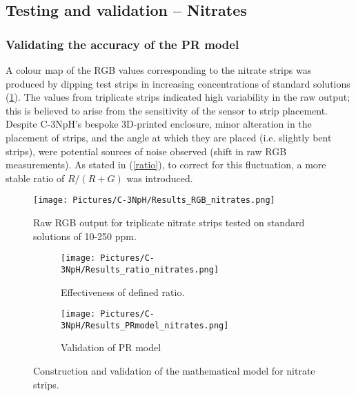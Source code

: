 






\subsection{Testing and validation -- Nitrates}

\subsubsection{Validating the accuracy of the PR model}
\noindent A colour map of the RGB values corresponding to the nitrate strips was produced by dipping test strips in increasing concentrations of standard solutions (\cref{fig:RGB_nitrates}). The values from triplicate strips indicated high variability in the raw output; this is believed to arise from the sensitivity of the sensor to strip placement. Despite C-3NpH’s bespoke 3D-printed enclosure, minor alteration in the placement of strips, and the angle at which they are placed (i.e. slightly bent strips), were potential sources of noise observed (shift in raw RGB measurements). As stated in (\cref{ratio}), to correct for this fluctuation, a more stable ratio of $R/(R+G)$ was introduced.
 
\begin{figure}[H]
	\centering
	\texttt{[image: Pictures/C-3NpH/Results\_RGB\_nitrates.png]}
	\captionsetup{justification = centering}
	\caption{Raw RGB output for triplicate nitrate strips tested on standard solutions of 10-250 ppm.}
	\label{fig:RGB_nitrates}
\end{figure}	

\begin{figure}[H]
	\centering
	\begin{subfigure}[b]{0.48\linewidth} 
		\centering
		\texttt{[image: Pictures/C-3NpH/Results\_ratio\_nitrates.png]}
		\caption{Effectiveness of defined ratio.}
		\label{subfig:RGB_nitrates}
	\end{subfigure}
	\begin{subfigure}[b]{0.48\linewidth}
		\texttt{[image: Pictures/C-3NpH/Results\_PRmodel\_nitrates.png]}
		\caption{Validation of PR model}
		\label{subfig:pr_nitrates}
	\end{subfigure}
	\captionsetup{justification = centering}
	\caption{Construction and validation of the mathematical model for nitrate strips.}
	\label{fig:nitrates_valid}
\end{figure}  

